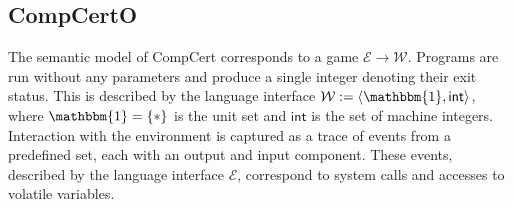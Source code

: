 \documentclass[acmsmall,screen,review,anonymous]{acmart}
\newcommand{\kw}[1]{\ensuremath{ \mathsf{#1} }}
\begin{document}


%
%
%
%
%

\subsection{CompCertO} \label{sec:mainideas:compcerto} %

The semantic model of CompCert corresponds to
a game $\mathcal{E} \rightarrow \mathcal{W}$.
Programs are run without any parameters
and produce a single integer denoting their exit status.
This is described by the language interface
$\mathcal{W} := \langle \mathbbm{1}, \kw{int} \rangle$,
where $\mathbbm{1} = \{ * \}$ is the unit set
and $\kw{int}$ is the set of machine integers.
Interaction with the environment
is captured as a trace of events from a predefined set,
each with an output and input component.
These events,
described by the language interface $\mathcal{E}$,
correspond to system calls and accesses to volatile variables.
\end{document}
